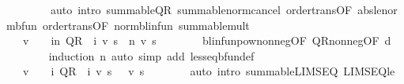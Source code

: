 \begin{isabellebody}
\ \ \ \ \ \ \ \ {\isacharparenleft}{\kern0pt}auto\ intro{\isacharbang}{\kern0pt}{\isacharcolon}{\kern0pt}\ summable{\isacharunderscore}{\kern0pt}QR\ summable{\isacharunderscore}{\kern0pt}norm{\isacharunderscore}{\kern0pt}cancel\ order{\isachardot}{\kern0pt}trans{\isacharbrackleft}{\kern0pt}OF\ abs{\isacharunderscore}{\kern0pt}le{\isacharunderscore}{\kern0pt}norm{\isacharunderscore}{\kern0pt}bfun{\isacharbrackright}{\kern0pt}\ order{\isachardot}{\kern0pt}trans{\isacharbrackleft}{\kern0pt}OF\ norm{\isacharunderscore}{\kern0pt}blinfun{\isacharbrackright}{\kern0pt}\ summable{\isacharunderscore}{\kern0pt}mult{}{\isacharparenright}{\kern0pt}\isanewline
\ \ \ \ \isamarkupfalse%
\ \isamarkupfalse%
\ {\isachardoublequoteopen}{}\ {\isasymle}\ v\ {\isasymLongrightarrow}\ {}\ {\isasymle}\ {\isacharparenleft}{\kern0pt}{\isasymSum}i{\isacharless}{\kern0pt}n{\isachardot}{\kern0pt}\ {\isacharparenleft}{\kern0pt}{\isacharquery}{\kern0pt}QR\ {\isacharcircum}{\kern0pt}{\isacharcircum}{\kern0pt}\ i{\isacharparenright}{\kern0pt}\ v\ s{\isacharparenright}{\kern0pt}{\isachardoublequoteclose}\ \ n\ v\ s\isanewline
\ \ \ \ \ \ \isamarkupfalse%
\ blinfunpow{\isacharunderscore}{\kern0pt}nonneg{\isacharbrackleft}{\kern0pt}OF\ QR{\isacharunderscore}{\kern0pt}nonneg{\isacharbrackleft}{\kern0pt}OF\ d{\isacharbrackright}{\kern0pt}{\isacharbrackright}{\kern0pt}\isanewline
\ \ \ \ \ \ \isamarkupfalse%
\ {\isacharparenleft}{\kern0pt}induction\ n{\isacharparenright}{\kern0pt}\ {\isacharparenleft}{\kern0pt}auto\ simp\ add{\isacharcolon}{\kern0pt}\ less{\isacharunderscore}{\kern0pt}eq{\isacharunderscore}{\kern0pt}bfun{\isacharunderscore}{\kern0pt}def{\isacharparenright}{\kern0pt}\isanewline
\ \ \ \ \isamarkupfalse%
\ \isamarkupfalse%
\ {\isachardoublequoteopen}{}\ {\isasymle}\ v\ {\isasymLongrightarrow}\ {}\ {\isasymle}\ {\isacharparenleft}{\kern0pt}{\isasymSum}i{\isachardot}{\kern0pt}\ {\isacharparenleft}{\kern0pt}{\isacharparenleft}{\kern0pt}{\isacharquery}{\kern0pt}QR\ {\isacharcircum}{\kern0pt}{\isacharcircum}{\kern0pt}\ i{\isacharparenright}{\kern0pt}\ v\ s{\isacharparenright}{\kern0pt}{\isacharparenright}{\kern0pt}\ {\isachardoublequoteclose}\ \ v\ s\isanewline
\ \ \ \ \ \ \isamarkupfalse%
\ {\isacharparenleft}{\kern0pt}auto\ intro{\isacharbang}{\kern0pt}{\isacharcolon}{\kern0pt}\ summable{\isacharunderscore}{\kern0pt}LIMSEQ\ LIMSEQ{\isacharunderscore}{\kern0pt}le{\isacharparenright}{\kern0pt}\isanewline

\end{isabellebody}
